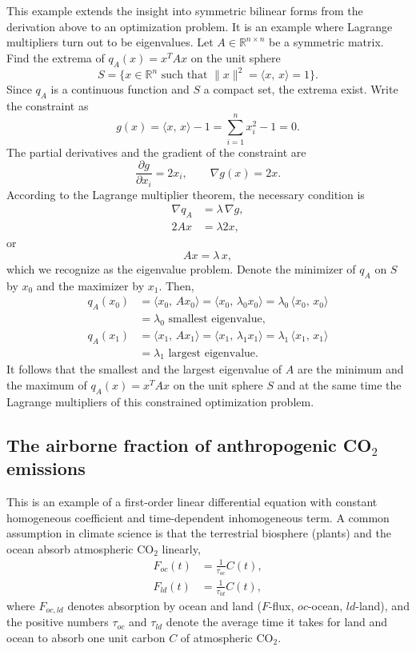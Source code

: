 \documentclass[graybox]{svmult}
\newcommand{\R}{\mathds{R}}
\begin{document}
This example extends the insight into symmetric bilinear forms from the derivation above to an optimization problem. It is an example where Lagrange multipliers turn out to be eigenvalues.  Let $A\in\R^{n\times n}$ be a symmetric matrix. Find the extrema of $q_A(x) = x^T Ax$ on the unit sphere
    \[
        S = \{x\in\R^n \mbox{ such that } \|x\|^2 = \langle x,\, x\rangle = 1\}.
    \]
    Since $q_A$ is a continuous function and $S$ a compact set, the extrema exist. Write the constraint as
    \[
        g(x) = \langle x,\, x\rangle - 1 = \sum_{i=1}^n x_i^2 - 1 = 0.
    \]
    The partial derivatives and the gradient of the constraint are
    \[
        \frac{\partial g}{\partial x_i} = 2x_i,\qquad \nabla g(x) = 2x.
    \]
   According to the Lagrange multiplier theorem, the necessary condition
    is
    \begin{align*}
    \nabla q_A &= \lambda \, \nabla g,\\
    2Ax &= \lambda 2x,
    \end{align*}
    or
    \[
    \displaystyle Ax = \lambda\, x,
    \]
    which we recognize as the eigenvalue problem. Denote the minimizer of
    $q_A$ on $S$ by $x_0$ and the maximizer by $x_1$.  Then,
    \begin{align*}
    q_A(x_0) &= \langle x_0,\, A x_0\rangle = \langle x_0,\, \lambda_0 x_0 \rangle = \lambda_0\, \langle x_0,\, x_0 \rangle\\
             &= \lambda_0 \mbox{ smallest eigenvalue},\\
    q_A(x_1) &= \langle x_1,\, A x_1\rangle = \langle x_1,\, \lambda_1 x_1 \rangle = \lambda_1\, \langle x_1,\, x_1 \rangle\\
             &= \lambda_1 \mbox{ largest eigenvalue}.
    \end{align*}
    It follows that the smallest and the largest eigenvalue of $A$ are the minimum and the maximum of $q_A(x) = x^T Ax$ on the unit sphere $S$ and at the same time the Lagrange multipliers of this constrained optimization problem.

\subsection{The airborne fraction of anthropogenic CO$_2$ emissions}

This is an example of a first-order linear differential equation with constant homogeneous coefficient and time-dependent inhomogeneous term. A common assumption in climate science is that the terrestrial biosphere (plants) and the ocean absorb atmospheric CO$_2$ linearly,
\begin{align*}
F_{oc}(t) &= \frac{1}{\tau_{oc}} C(t), \\
F_{ld}(t) &= \frac{1}{\tau_{ld}} C(t),
\end{align*}
where $F_{oc,ld}$ denotes absorption by ocean and land ($F$-flux, $oc$-ocean, $ld$-land), and the positive numbers $\tau_{oc}$ and $\tau_{ld}$ denote the average time it takes for land and ocean to absorb one unit carbon $C$ of atmospheric CO$_2$. 
\end{document}
